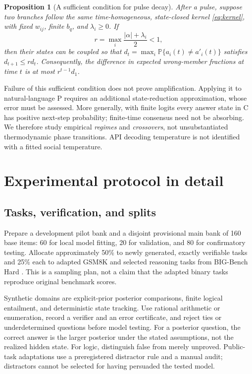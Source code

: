 \documentclass[11pt]{article}
\newtheorem{proposition}{Proposition}
\newcommand{\Prob}{\mathbb P}
\begin{document}
\begin{proposition}[A sufficient condition for pulse decay]
\label{prop:contraction}
After a pulse, suppose two branches follow the same time-homogeneous, state-closed kernel \eqref{eq:kernel}, with fixed $w_{ij}$, finite $b_q$, and $\lambda_i\ge0$. If
\[
 r=\max_i\frac{|\alpha|+\lambda_i}{2}<1,
\]
then their states can be coupled so that $d_t=\max_i\Prob\{a_i(t)\ne a'_i(t)\}$ satisfies $d_{t+1}\le r d_t$. Consequently, the difference in expected wrong-member fractions at time $t$ is at most $r^{t-1}d_1$.
\end{proposition}
Failure of this sufficient condition does not prove amplification. Applying it to natural-language P requires an additional state-reduction approximation, whose error must be assessed. More generally, with finite logits every answer state in C has positive next-step probability; finite-time consensus need not be absorbing. We therefore study empirical \emph{regimes} and \emph{crossovers}, not unsubstantiated thermodynamic phase transitions. API decoding temperature is not identified with a fitted social temperature.

\section{Experimental protocol in detail}
\label{sec:experiments}
\subsection{Tasks, verification, and splits}
Prepare a development pilot bank and a disjoint provisional main bank of 160 base items: 60 for local model fitting, 20 for validation, and 80 for confirmatory testing. Allocate approximately 50\% to newly generated, exactly verifiable tasks and 25\% each to adapted GSM8K \citep{cobbe2021verifiers} and selected reasoning tasks from BIG-Bench Hard \citep{suzgun2022bbh}. This is a sampling plan, not a claim that the adapted binary tasks reproduce original benchmark scores.

Synthetic domains are explicit-prior posterior comparisons, finite logical entailment, and deterministic state tracking. Use rational arithmetic or enumeration, record a verifier and an error certificate, and reject ties or underdetermined questions before model testing. For a posterior question, the correct answer is the larger posterior under the stated assumptions, not the realized hidden state. For logic, distinguish false from merely unproved. Public-task adaptations use a preregistered distractor rule and a manual audit; distractors cannot be selected for having persuaded the tested model.
\end{document}
